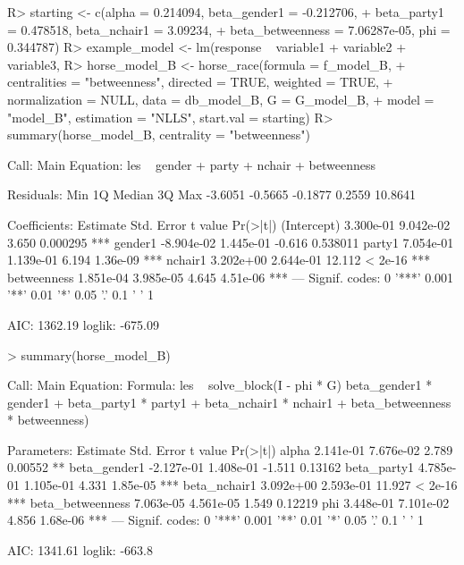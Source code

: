 \documentclass[nojss]{jss}
\begin{document}
\begin{CodeChunk}
\begin{CodeInput}
R> starting <- c(alpha = 0.214094, beta_gender1 = -0.212706,
+    beta_party1 = 0.478518, beta_nchair1 = 3.09234,
+    beta_betweenness = 7.06287e-05, phi = 0.344787)
R> example_model <- lm(response ~ variable1 + variable2 + variable3, 
R> horse_model_B <- horse_race(formula = f_model_B, 
+    centralities = "betweenness", directed = TRUE, weighted = TRUE, 
+    normalization = NULL, data = db_model_B, G = G_model_B,
+    model = "model_B", estimation = "NLLS", start.val = starting)
R> summary(horse_model_B, centrality = "betweenness")
\end{CodeInput}
\begin{CodeOutput}
Call:
Main Equation:  les ~ gender + party + nchair + betweenness

Residuals:
Min      1Q  Median      3Q     Max 
-3.6051 -0.5665 -0.1877  0.2559 10.8641 

Coefficients:
Estimate Std. Error t value Pr(>|t|)    
(Intercept)  3.300e-01  9.042e-02   3.650 0.000295 ***
gender1     -8.904e-02  1.445e-01  -0.616 0.538011    
party1       7.054e-01  1.139e-01   6.194 1.36e-09 ***
nchair1      3.202e+00  2.644e-01  12.112  < 2e-16 ***
betweenness  1.851e-04  3.985e-05   4.645 4.51e-06 ***
---
Signif. codes:  0 '***' 0.001 '**' 0.01 '*' 0.05 '.' 0.1 ' ' 1

AIC: 1362.19  loglik: -675.09
\end{CodeOutput}
\begin{CodeInput}
> summary(horse_model_B)
\end{CodeInput}
\begin{CodeOutput}
Call:
Main Equation:
Formula: les ~ solve_block(I - phi * G) %
beta_gender1 * gender1 + beta_party1 * party1 + 
beta_nchair1 * nchair1 + beta_betweenness * betweenness)

Parameters:
Estimate Std. Error t value Pr(>|t|)    
alpha             2.141e-01  7.676e-02   2.789  0.00552 ** 
beta_gender1     -2.127e-01  1.408e-01  -1.511  0.13162    
beta_party1       4.785e-01  1.105e-01   4.331 1.85e-05 ***
beta_nchair1      3.092e+00  2.593e-01  11.927  < 2e-16 ***
beta_betweenness  7.063e-05  4.561e-05   1.549  0.12219    
phi               3.448e-01  7.101e-02   4.856 1.68e-06 ***
---
Signif. codes:  0 '***' 0.001 '**' 0.01 '*' 0.05 '.' 0.1 ' ' 1

AIC: 1341.61  loglik: -663.8
\end{CodeOutput}
\end{CodeChunk}
\end{document}
